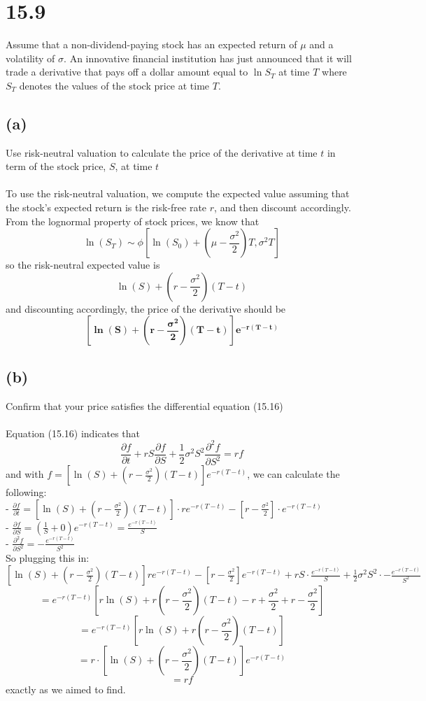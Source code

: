 \documentclass{article}
\begin{document}
{\Large 

\section*{15.9}
Assume that a non-dividend-paying stock has an expected return of \(\mu\) and a volatility of \(\sigma\). An innovative financial institution has just announced that it will trade a derivative that pays off a dollar amount equal to \(\ln S_T\) at time \(T\) where \(S_T\) denotes the values of the stock price at time \(T\).

\subsection*{(a)} 
Use risk-neutral valuation to calculate the price of the derivative at time \(t\) in term of the stock price, \(S\), at time \(t\) \\ \\
To use the risk-neutral valuation, we compute the expected value assuming that the stock's expected return is the risk-free rate \(r\), and then discount accordingly. From the lognormal property of stock prices, we know that 
\[
  \ln(S_T) \sim \phi[\ln(S_0) + (\mu - \frac{\sigma^2}{2})T, \sigma^2 T]
\]
so the risk-neutral expected value is 
\[
  \ln(S) + (r - \frac{\sigma^2}{2})(T-t)
\]
and discounting accordingly, the price of the derivative should be 
\[
  \boxed{\mathbf{[\ln(S) + (r - \frac{\sigma^2}{2})(T-t)]e^{-r(T-t)}}}
\]

\subsection*{(b)}
Confirm that your price satisfies the differential equation (15.16) \\ \\
Equation (15.16) indicates that 
\[
  \frac{\partial f}{\partial t} + r S \frac{\partial f}{\partial S} + \frac{1}{2} \sigma^2 S^2 \frac{\partial^2 f}{\partial S^2} = rf
\]
and with \(f = [\ln(S) + (r - \frac{\sigma^2}{2})(T-t)]e^{-r(T-t)}\), we can calculate the following: \\
- \(\frac{\partial f}{\partial t} = [\ln(S) + (r - \frac{\sigma^2}{2})(T-t)] \cdot re^{-r(T-t)} - [r - \frac{\sigma^2}{2}] \cdot e^{-r(T-t)} \) \\ 
- \(\frac{\partial f}{\partial S} = (\frac{1}{S} + 0)e^{-r(T-t)} = \frac{e^{-r(T-t)}}{S} \) \\
- \(\frac{\partial^2 f}{\partial S^2} = - \frac{e^{-r(T-t)}}{S^2}\) \\
So plugging this in: \\
\(
  [\ln(S) + (r - \frac{\sigma^2}{2})(T-t)] re^{-r(T-t)} - [r - \frac{\sigma^2}{2}] e^{-r(T-t)} + r S \cdot \frac{e^{-r(T-t)}}{S} + \frac{1}{2} \sigma^2 S^2 \cdot - \frac{e^{-r(T-t)}}{S^2}
\) \\
\[
  = e^{-r(T-t)}[r\ln(S) + r(r - \frac{\sigma^2}{2})(T-t) - r + \frac{\sigma^2}{2} + r - \frac{\sigma^2}{2}]
\]
\[
  = e^{-r(T-t)}[r\ln(S) + r(r - \frac{\sigma^2}{2})(T-t)]
\]
\[
  = r \cdot [\ln(S) + (r - \frac{\sigma^2}{2})(T-t)]e^{-r(T-t)}
\]
\[
  = rf
\]
exactly as we aimed to find. 

}
\end{document}
